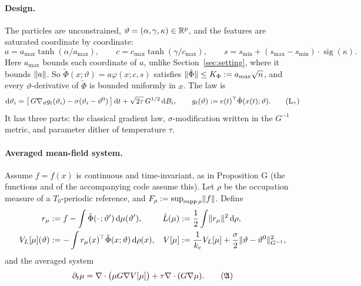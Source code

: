 \paragraph{Design.}
The particles are unconstrained, $\vartheta = (\alpha, \gamma, \kappa) \in \mathbb{R}^p$, and the features are saturated
coordinate by coordinate:
\[
  a = a_{\max}\tanh(\alpha/a_{\max}), \qquad c = c_{\max}\tanh(\gamma/c_{\max}), \qquad
  s = s_{\min} + (s_{\max} - s_{\min})\cdot\operatorname{sig}(\kappa).
\]
Here $a_{\max}$ bounds each coordinate of $a$, unlike Section~\ref{sec:setting}, where it bounds $\lVert a\rVert$. So
$\tilde\Phi(x;\vartheta) = a\varphi(x;c,s)$ satisfies $\lVert \tilde\Phi\rVert \le K_\Phi := a_{\max}\sqrt{n}$, and every
$\vartheta$-derivative of $\tilde\Phi$ is bounded uniformly in $x$. The law is
\begin{equation}
  \mathrm{d}\vartheta_i = \bigl[\, G\nabla_\vartheta g_t(\vartheta_i) - \sigma(\vartheta_i - \vartheta^0) \,\bigr]\dd t
  + \sqrt{2\tau}\, G^{1/2}\dd B_i, \qquad g_t(\vartheta) := e(t)^\T\tilde\Phi(x(t);\vartheta).
  \tag{$\mathrm{L}_\tau$}\label{eq:thmH:Ltau}
\end{equation}
It has three parts: the classical gradient law, $\sigma$-modification written in the $G^{-1}$ metric, and parameter
dither of temperature $\tau$.

\paragraph{Averaged mean-field system.}
Assume $f = f(x)$ is continuous and time-invariant, as in Proposition G (the functions  and
 of the accompanying code assume this). Let $\rho$ be the occupation measure of a $T_0$-periodic
reference, and $F_\rho := \sup_{\operatorname{supp}\rho}\lVert f\rVert$. Define
\begin{align*}
  r_\mu &:= f - \int\tilde\Phi(\cdot\,;\vartheta')\,\mathrm{d}\mu(\vartheta'), &
  \bar L(\mu) &:= \frac12\int\lVert r_\mu\rVert^2\,\mathrm{d}\rho, \\
  V_L[\mu](\vartheta) &:= -\int r_\mu(x)^\top\tilde\Phi(x;\vartheta)\,\mathrm{d}\rho(x), &
  V[\mu] &:= \frac{1}{k_e}V_L[\mu] + \frac{\sigma}{2}\lVert \vartheta - \vartheta^0\rVert^2_{G^{-1}},
\end{align*}
and the averaged system
\begin{equation}
  \partial_t\mu = \nabla\cdot\bigl(\mu G\nabla V[\mu]\bigr) + \tau\nabla\cdot(G\nabla\mu).
  \tag{$\mathfrak{A}$}\label{eq:thmH:A}
\end{equation}

